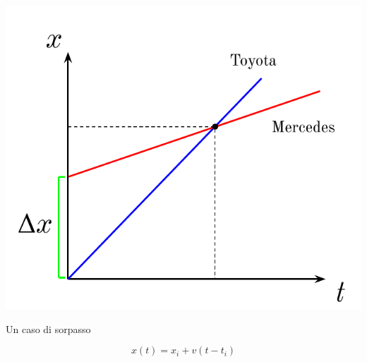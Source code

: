 \begin{marginfigure}
    \centering
    \includegraphics[width = \marginparwidth]{figures/sorpasso.pdf}
    \caption{Un caso di sorpasso}
\end{marginfigure}

\[  \]
\[ x(t) = x_i + v(t - t_i)  \]